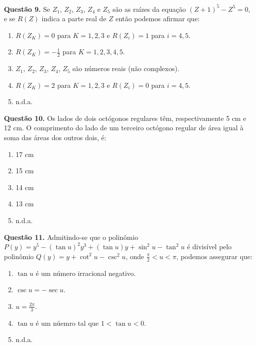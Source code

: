 \documentclass[11pt]{article}
\begin{document}
\textbf{Questão 9.} Se $Z_1$, $Z_2$, $Z_3$, $Z_4$ e $Z_5$ são as raízes da equação $(Z + 1)^5 - Z^5 = 0$, e se $R(Z)$ indica a parte real de $Z$ então podemos afirmar que:

\begin{enumerate}[\bf A (\quad)]
    \item $R(Z_K) = 0$ para $K = 1, 2, 3$ e $R(Z_i) = 1$ para $i = 4, 5$.
    \item $\displaystyle R(Z_K) = -\frac{1}{2}$ para $K = 1, 2, 3, 4, 5$.
    \item $Z_1$, $Z_2$, $Z_3$, $Z_4$, $Z_5$ são números reais (não complexos).
    \item $R(Z_K) = 2$ para $K = 1, 2, 3$ e  $R(Z_i) = 0$ para $i = 4, 5$.
    \item n.d.a.
\end{enumerate}

\newpage

\textbf{Questão 10.} Os lados de dois octógonos regulares têm, respectivamente 5 cm e 12 cm. O comprimento do lado de um terceiro octógono regular de área igual à soma das áreas dos outros dois, é:

\begin{multicols}{5}
    \begin{enumerate}[\bf A (\quad)]
        \item 17 cm
        \item 15 cm
        \item 14 cm
        \item 13 cm
        \item n.d.a.
    \end{enumerate}
    \end{multicols}
    

\textbf{Questão 11.} Admitindo-se que o polinômio $P(y) = y^5 - (\tan u)^2 y ^3 + (\tan u) y + \sin^2 u - \tan^2 u$ é divisível pelo polinômio $Q(y) = y + \cot^2 u - \csc^2 u$, onde $\displaystyle \frac{\pi}{2} < u < \pi$, podemos assegurar que:


\begin{enumerate}[\bf A (\quad)]
    \item $\tan u$ é um número irracional negativo.
    \item $\csc u = - \sec u$.
    \item $\displaystyle u = \frac{2\pi}{3}$.
    \item $\tan u$ é um núemro tal que $1 < \tan u < 0$.
    \item n.d.a.
\end{enumerate}
\end{document}
